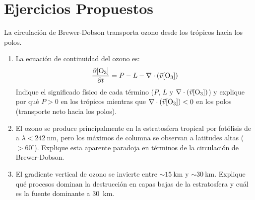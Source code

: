 
\section*{Ejercicios Propuestos}
\label{sec:ejercicios_cap09}

\begin{bloque_ejercicios}

\begin{ejercicios}

\item La circulaci\'on de Brewer-Dobson transporta ozono
desde los tr\'opicos hacia los polos.

\begin{enumerate}[label=\alph*)]
    \item La ecuaci\'on de continuidad del ozono es:
          \[
              \frac{\partial [\ce{O3}]}{\partial t}
              = P - L - \nabla\cdot(\vec{v}[\ce{O3}])
          \]
          Indique el significado f\'isico de cada t\'ermino
          ($P$, $L$ y $\nabla\cdot(\vec{v}[\ce{O3}])$)
          y explique por qu\'e $P > 0$ en los tr\'opicos
          mientras que $\nabla\cdot(\vec{v}[\ce{O3}]) < 0$
          en los polos (transporte neto hacia los polos).

    \item El ozono se produce principalmente en la
          estratosfera tropical por fot\'olisis de 
          a $\lambda < \SI{242}{\nano\metre}$,
          pero los m\'aximos de columna se observan a
          latitudes altas ($>60^\circ$).
          Explique esta aparente paradoja en t\'erminos
          de la circulaci\'on de Brewer-Dobson.

    \item El gradiente vertical de ozono se invierte
          entre $\sim\SI{15}{\kilo\metre}$
          y $\sim\SI{30}{\kilo\metre}$.
          Explique qu\'e procesos dominan la destrucci\'on
          en capas bajas de la estratosfera y cu\'al es
          la fuente dominante a \SI{30}{\kilo\metre}.


\end{enumerate}
\end{ejercicios}
\end{bloque_ejercicios}
